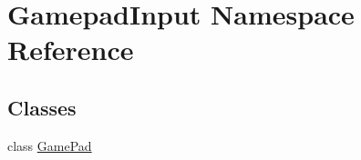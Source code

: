 \hypertarget{namespace_gamepad_input}{}\section{Gamepad\+Input Namespace Reference}
\label{namespace_gamepad_input}
\subsection*{Classes}
\begin{DoxyCompactItemize}
\item 
class \hyperlink{class_gamepad_input_1_1_game_pad}{Game\+Pad}
\end{DoxyCompactItemize}
